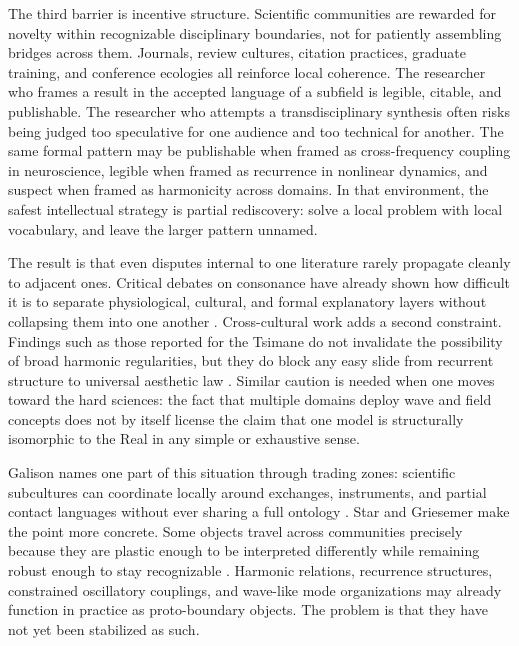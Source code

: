 The third barrier is incentive structure. Scientific communities are rewarded for novelty within recognizable disciplinary boundaries, not for patiently assembling bridges across them. Journals, review cultures, citation practices, graduate training, and conference ecologies all reinforce local coherence. The researcher who frames a result in the accepted language of a subfield is legible, citable, and publishable. The researcher who attempts a transdisciplinary synthesis often risks being judged too speculative for one audience and too technical for another. The same formal pattern may be publishable when framed as cross-frequency coupling in neuroscience, legible when framed as recurrence in nonlinear dynamics, and suspect when framed as harmonicity across domains. In that environment, the safest intellectual strategy is partial rediscovery: solve a local problem with local vocabulary, and leave the larger pattern unnamed.

The result is that even disputes internal to one literature rarely propagate cleanly to adjacent ones. Critical debates on consonance have already shown how difficult it is to separate physiological, cultural, and formal explanatory layers without collapsing them into one another \parencite{parncutt_2011}. Cross-cultural work adds a second constraint. Findings such as those reported for the Tsimane do not invalidate the possibility of broad harmonic regularities, but they do block any easy slide from recurrent structure to universal aesthetic law \parencite{mcdermott_2016}. Similar caution is needed when one moves toward the hard sciences: the fact that multiple domains deploy wave and field concepts does not by itself license the claim that one model is structurally isomorphic to the Real in any simple or exhaustive sense.

Galison names one part of this situation through trading zones: scientific subcultures can coordinate locally around exchanges, instruments, and partial contact languages without ever sharing a full ontology \parencite{galison_1997}. Star and Griesemer make the point more concrete. Some objects travel across communities precisely because they are plastic enough to be interpreted differently while remaining robust enough to stay recognizable \parencite{star_1989}. Harmonic relations, recurrence structures, constrained oscillatory couplings, and wave-like mode organizations may already function in practice as proto-boundary objects. The problem is that they have not yet been stabilized as such.

